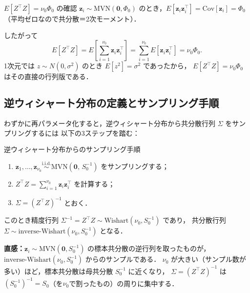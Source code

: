 \documentclass[lualatex,ja=standard,a4paper,12pt]{bxjsarticle}
\newcommand{\mvn}{\mathrm{MVN}}
\newcommand{\IW}{\mathrm{inverse\text{-}Wishart}}
\begin{document}
\begin{derivbox}{$E[Z^\top Z] = \nu_0 \Phi_0$ の確認}
$\bm{z}_i \sim \mvn(\bm{0}, \Phi_0)$ のとき，$E[\bm{z}_i\bm{z}_i^\top] = \mathrm{Cov}[\bm{z}_i] = \Phi_0$（平均ゼロなので共分散＝2次モーメント）．

したがって
\[
  E\!\left[Z^\top Z\right] = E\!\left[\sum_{i=1}^{\nu_0}\bm{z}_i\bm{z}_i^\top\right]
  = \sum_{i=1}^{\nu_0} E[\bm{z}_i\bm{z}_i^\top]
  = \nu_0 \Phi_0.
\]
1次元では $z \sim N(0, \sigma^2)$ のとき $E[z^2] = \sigma^2$ であったから，
$E[Z^\top Z] = \nu_0\Phi_0$ はその直接の行列版である．
\end{derivbox}

\subsection{逆ウィシャート分布の定義とサンプリング手順}

わずかに再パラメータ化すると，逆ウィシャート分布から共分散行列 $\Sigma$ をサンプリングするには
以下の3ステップを踏む：

\begin{algobox}{逆ウィシャート分布からのサンプリング手順}
\begin{enumerate}
  \item $\bm{z}_1, \ldots, \bm{z}_{\nu_0} \overset{\mathrm{i.i.d.}}{\sim} \mvn(\bm{0},\, S_0^{-1})$ をサンプリングする；
  \item $Z^\top Z = \sum_{i=1}^{\nu_0} \bm{z}_i\bm{z}_i^\top$ を計算する；
  \item $\Sigma = (Z^\top Z)^{-1}$ とおく．
\end{enumerate}
このとき精度行列 $\Sigma^{-1} = Z^\top Z \sim \mathrm{Wishart}(\nu_0, S_0^{-1})$ であり，
共分散行列 $\Sigma \sim \IW(\nu_0, S_0^{-1})$ となる．
\end{algobox}

\begin{pointbox}
\textbf{直感：}$\bm{z}_i \sim \mvn(\bm{0}, S_0^{-1})$ の標本共分散の逆行列を取ったものが，
$\IW(\nu_0, S_0^{-1})$ からのサンプルである．
$\nu_0$ が大きい（サンプル数が多い）ほど，標本共分散は母共分散 $S_0^{-1}$ に近くなり，
$\Sigma = (Z^\top Z)^{-1}$ は $(S_0^{-1})^{-1} = S_0$（を$\nu_0$で割ったもの）の周りに集中する．
\end{pointbox}
\end{document}
